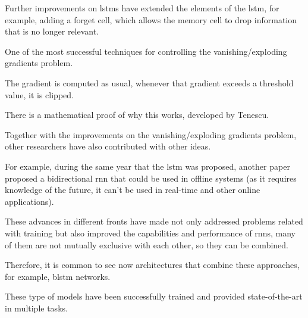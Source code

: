 Further improvements on \glspl{lstm} have extended the
elements of the \gls{lstm}, for example, adding a forget cell,
which allows the memory cell to drop information that is no
longer relevant.

 One of the most successful techniques for
controlling the vanishing/exploding gradients problem.

The gradient is computed as usual, whenever that gradient
exceeds a threshold value, it is clipped.

There is a mathematical proof of why this works, developed
by Tenescu.

 Together with the improvements on
the vanishing/exploding gradients problem, other researchers
have also contributed with other ideas.

For example, during the same year that the \gls{lstm} was
proposed, another paper proposed a bidirectional \gls{rnn}
that could be used in offline systems (as it requires
knowledge of the future, it can’t be used in real-time and
other online applications).

These advances in different fronts have made not only
addressed problems related with training but also improved
the capabilities and performance of \glspl{rnn}, many of
them are not mutually exclusive with each other, so they can
be combined.

Therefore, it is common to see now architectures that
combine these approaches, for example, \gls{blstm} networks.

These type of models have been successfully trained and
provided state-of-the-art in multiple tasks.
